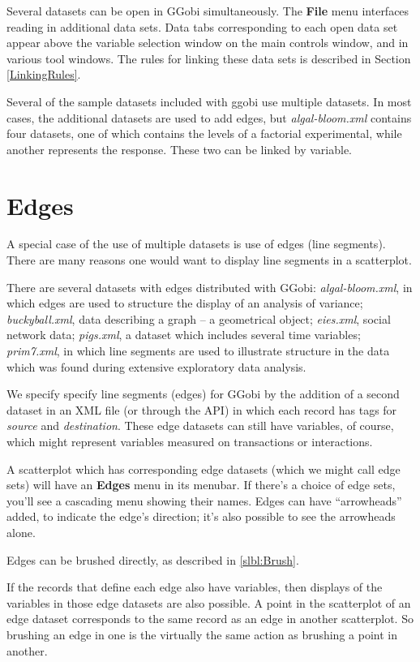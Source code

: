 \documentclass[11pt]{article}
\begin{document}
Several datasets can be open in GGobi simultaneously. The {\bf File}
menu interfaces reading in additional data sets. Data tabs corresponding
to each open data set appear above the variable selection window on
the main controls window, and in various tool windows. The rules for
linking these data sets is described in Section \ref{LinkingRules}.

Several of the sample datasets included with ggobi use multiple datasets.
In most cases, the additional datasets are used to add edges, but {\em
algal-bloom.xml} contains four datasets, one of which contains the levels
of a factorial experimental, while another represents the response.
These two can be linked by variable.

\section{Edges}

A special case of the use of multiple datasets is use of edges (line
segments).  There are many reasons one would want to display line segments
in a scatterplot. 

There are several datasets with edges distributed with GGobi: {\em
algal-bloom.xml}, in which edges are used to structure the display of an
analysis of variance; {\em buckyball.xml}, data describing a graph -- a
geometrical object; {\em eies.xml}, social network data; {\em pigs.xml},
a dataset which includes several time variables; {\em prim7.xml},
in which line segments are used to illustrate structure in the
data which was found during extensive exploratory data analysis.

We specify specify line segments (edges) for GGobi by the addition of a
second dataset in an XML file (or through the API) in which each record
has tags for {\it source} and {\it destination}.  These edge datasets
can still have variables, of course, which might represent variables
measured on transactions or interactions.

A scatterplot which has corresponding edge datasets (which we might call
edge sets) will have an {\bf Edges} menu in its menubar.  If there's a
choice of edge sets, you'll see a cascading menu showing their names.
Edges can have ``arrowheads'' added, to indicate the edge's direction;
it's also possible to see the arrowheads alone.

Edges can be brushed directly, as described in \ref{slbl:Brush}.

If the records that define each edge also have variables, then
displays of the variables in those edge datasets are also possible.
A point in the scatterplot of an edge dataset corresponds to the
same record as an edge in another scatterplot.  So brushing an
edge in one is the virtually the same action as brushing a point
in another.
\end{document}
